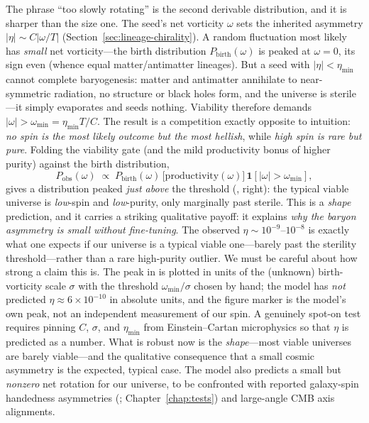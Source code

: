 The phrase ``too slowly rotating'' is the second derivable distribution, and it is
sharper than the size one. The seed's net vorticity $\omega$ sets the inherited
asymmetry $|\eta|\sim C|\omega/T|$ (Section~\ref{sec:lineage-chirality}). A random
fluctuation most likely has \emph{small} net vorticity---the birth distribution
$P_{\mathrm{birth}}(\omega)$ is peaked at $\omega=0$, its sign even (whence equal
matter/antimatter lineages). But a seed with $|\eta|<\eta_{\min}$ cannot complete
baryogenesis: matter and antimatter annihilate to near-symmetric radiation, no
structure or black holes form, and the universe is sterile---it simply evaporates
and seeds nothing. Viability therefore demands $|\omega| > \omega_{\min} =
\eta_{\min}T/C$. The result is a competition exactly opposite to intuition:
\emph{no spin is the most likely outcome but the most hellish}, while \emph{high
spin is rare but pure}. Folding the viability gate (and the mild productivity bonus
of higher purity) against the birth distribution,
\begin{equation}
  P_{\mathrm{obs}}(\omega) \;\propto\; P_{\mathrm{birth}}(\omega)\,
  \bigl[\text{productivity}(\omega)\bigr]\,\mathbf{1}\!\left[|\omega|>\omega_{\min}\right],
  \label{eq:spindist}
\end{equation}
gives a distribution peaked \emph{just above} the threshold
(, right): the typical viable universe is \emph{low}-spin and
\emph{low}-purity, only marginally past sterile. This is a \emph{shape} prediction,
and it carries a striking qualitative payoff: it explains \emph{why the baryon
asymmetry is small without fine-tuning}. The observed $\eta\sim10^{-9}$--$10^{-8}$
is exactly what one expects if our universe is a typical viable one---barely past
the sterility threshold---rather than a rare high-purity outlier. We must be
careful about how strong a claim this is. The peak in  is plotted
in units of the (unknown) birth-vorticity scale $\sigma$ with the threshold
$\omega_{\min}/\sigma$ chosen by hand; the model has \emph{not} predicted
$\eta\approx6\times10^{-10}$ in absolute units, and the figure marker is the
model's own peak, not an independent measurement of our spin. A genuinely spot-on
test requires pinning $C$, $\sigma$, and $\eta_{\min}$ from Einstein--Cartan
microphysics so that $\eta$ is predicted as a number. What is robust now is the
\emph{shape}---most viable universes are barely viable---and the qualitative
consequence that a small cosmic asymmetry is the expected, typical case. The model
also predicts a small but \emph{nonzero} net rotation for our universe, to be
confronted with reported galaxy-spin handedness asymmetries (\citealp{shamir2025};
Chapter~\ref{chap:tests}) and large-angle CMB axis alignments.

